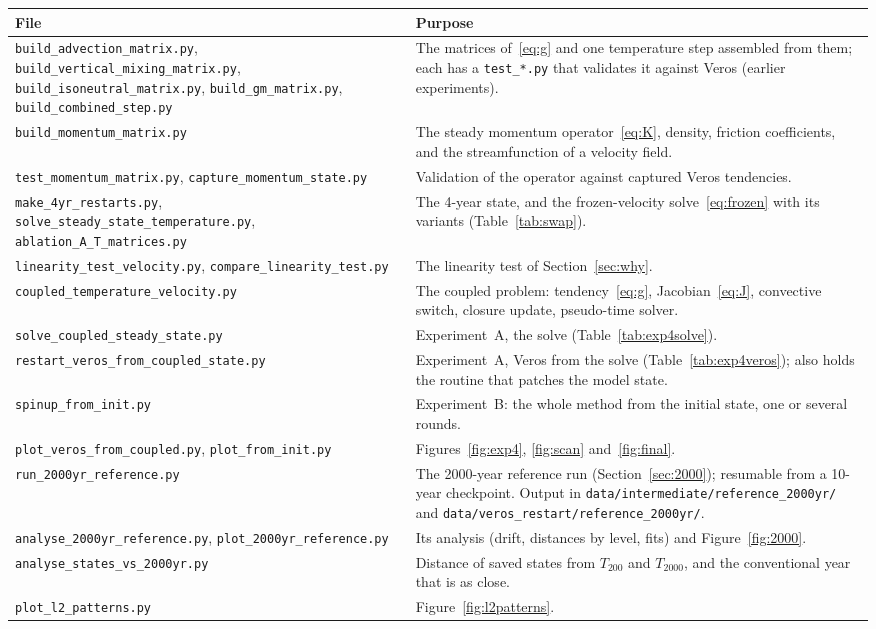 \documentclass{article}
\begin{document}
\begin{table}[htbp]
\centering
\small
\renewcommand{\arraystretch}{1.2}
\begin{tabular}{p{}|p{}}
\toprule
File & Purpose \\
\midrule
\texttt{build\_advection\_matrix.py}, \texttt{build\_vertical\_mixing\_matrix.py}, \texttt{build\_isoneutral\_matrix.py}, \texttt{build\_gm\_matrix.py}, \texttt{build\_combined\_step.py} & The matrices of~\eqref{eq:g} and one temperature step assembled from them; each has a \texttt{test\_*.py} that validates it against Veros (earlier experiments). \\
\texttt{build\_momentum\_matrix.py} & The steady momentum operator~\eqref{eq:K}, density, friction coefficients, and the streamfunction of a velocity field. \\
\texttt{test\_momentum\_matrix.py}, \texttt{capture\_momentum\_state.py} & Validation of the operator against captured Veros tendencies. \\
\texttt{make\_4yr\_restarts.py}, \texttt{solve\_steady\_state\_temperature.py}, \texttt{ablation\_A\_T\_matrices.py} & The 4-year state, and the frozen-velocity solve~\eqref{eq:frozen} with its variants (Table~\ref{tab:swap}). \\
\texttt{linearity\_test\_velocity.py}, \texttt{compare\_linearity\_test.py} & The linearity test of Section~\ref{sec:why}. \\
\texttt{coupled\_temperature\_velocity.py} & The coupled problem: tendency~\eqref{eq:g}, Jacobian~\eqref{eq:J}, convective switch, closure update, pseudo-time solver. \\
\texttt{solve\_coupled\_steady\_state.py} & Experiment~A, the solve (Table~\ref{tab:exp4solve}). \\
\texttt{restart\_veros\_from\_coupled\_state.py} & Experiment~A, Veros from the solve (Table~\ref{tab:exp4veros}); also holds the routine that patches the model state. \\
\texttt{spinup\_from\_init.py} & Experiment~B: the whole method from the initial state, one or several rounds. \\
\texttt{plot\_veros\_from\_coupled.py}, \texttt{plot\_from\_init.py} & Figures~\ref{fig:exp4}, \ref{fig:scan} and~\ref{fig:final}. \\
\texttt{run\_2000yr\_reference.py} & The 2000-year reference run (Section~\ref{sec:2000}); resumable from a 10-year checkpoint. Output in \texttt{data/intermediate/reference\_2000yr/} and \texttt{data/veros\_restart/reference\_2000yr/}. \\
\texttt{analyse\_2000yr\_reference.py}, \texttt{plot\_2000yr\_reference.py} & Its analysis (drift, distances by level, fits) and Figure~\ref{fig:2000}. \\
\texttt{analyse\_states\_vs\_2000yr.py} & Distance of saved states from $T_{200}$ and $T_{2000}$, and the conventional year that is as close. \\
\texttt{plot\_l2\_patterns.py} & Figure~\ref{fig:l2patterns}. \\
\bottomrule
\end{tabular}
\end{table}
\end{document}
